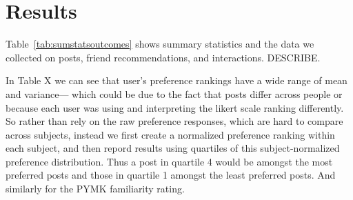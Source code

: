 \documentclass[12pt,letterpaper]{article}
\begin{document}








\section{Results}

Table~\ref{tab:sumstatsoutcomes} shows summary statistics and the data we collected on posts, friend recommendations, and interactions.  DESCRIBE.

In Table X we can see that user's preference rankings have a wide range of mean and variance--- which could be due to the fact that posts differ across people or because each user was using and interpreting the likert scale ranking differently.  So rather than rely on the raw preference responses, which are hard to compare across subjects, instead we first create a normalized preference ranking within each subject, and then repord results using quartiles of this subject-normalized preference distribution.  Thus a post in quartile 4 would be amongst the most preferred posts and those in quartile 1 amongst the least preferred posts. And similarly for the PYMK familiarity rating. 
\end{document}
